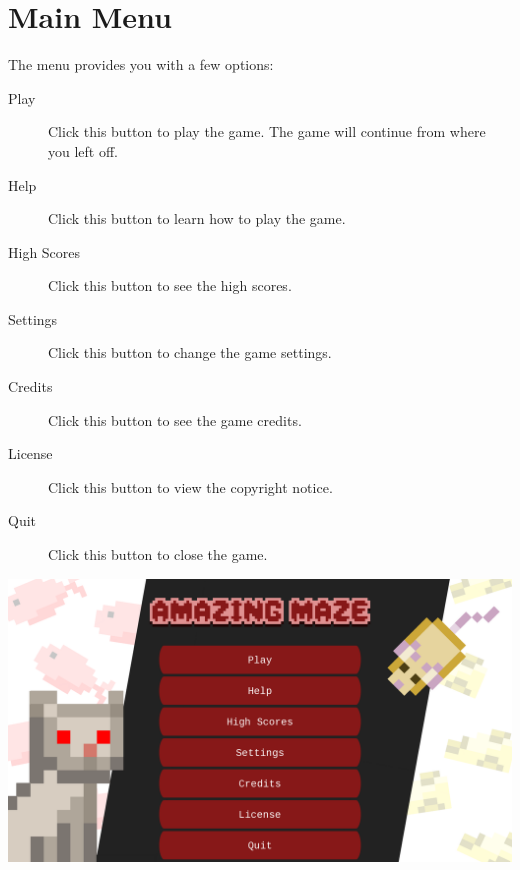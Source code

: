 \documentclass[12pt]{book}
\begin{document}
	\chapter{Main Menu}
		The menu provides you with a few options:
		\begin{description}
			\item[Play] Click this button to play the game. The game will continue from where you left off.
			\item[Help] Click this button to learn how to play the game.
			\item[High Scores] Click this button to see the high scores.
			\item[Settings] Click this button to change the game settings.
			\item[Credits] Click this button to see the game credits.
			\item[License] Click this button to view the copyright notice.
			\item[Quit] Click this button to close the game.
		\end{description}
		\newpage
		\vspace*{\fill}
		\includegraphics[width=\textwidth]{MainMenu}
		\vspace*{\fill}
\end{document}
